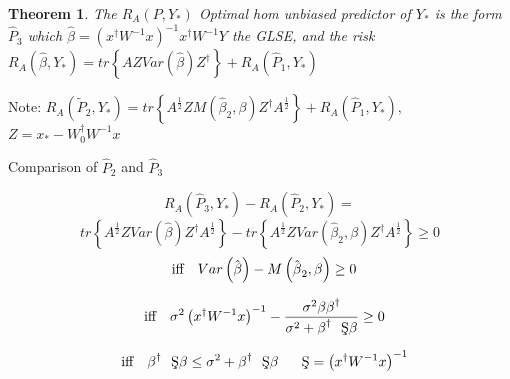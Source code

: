 \documentclass{article}
\newtheorem{theorem}{Theorem}
\begin{document}
\bigskip

\begin{theorem}
The $R_{A}\left( P,Y_{\ast }\right) $ Optimal hom unbiased predictor of $%
Y_{\ast }$ is the form $\hat{P}_{3}$ which $\hat{\beta}=\left( x^{\dagger
}W^{-1}x\right) ^{-1}x^{\dagger }W^{-1}Y$ the GLSE, and the risk $%
R_{A}\left( \hat{\beta},Y_{\ast }\right) =tr\left\{ AZVar\left( \hat{\beta}%
\right) Z^{\dagger }\right\} +R_{A}\left( \hat{P}_{1},Y_{\ast }\right) $
\end{theorem}

Note: $R_{A}\left( \tilde{P}_{2},Y_{\ast }\right) =tr\left\{ A^{\frac{1}{2}%
}ZM\left( \hat{\beta}_{2},\beta \right) Z^{\dagger }A^{\frac{1}{2}}\right\}
+R_{A}\left( \hat{P}_{1},Y_{\ast }\right) ,$ $Z=x_{\ast }-W_{0}^{\dagger
}W^{-1}x$

\bigskip 

Comparison of $\hat{P}_{2}$ and $\hat{P}_{3}$

\begin{equation*}
R_{A}\left( \hat{P}_{3},Y_{\ast }\right) -R_{A}\left( \hat{P}_{2},Y_{\ast
}\right) =
\end{equation*}%
\begin{equation*}
tr\left\{ A^{\frac{1}{2}}ZVar\left( \hat{\beta}\right) Z^{\dagger }A^{\frac{1%
}{2}}\right\} -tr\left\{ A^{\frac{1}{2}}ZVar\left( \hat{\beta}_{2},\beta
\right) Z^{\dagger }A^{\frac{1}{2}}\right\} \geq 0
\end{equation*}%
\begin{equation*}
\text{iff\quad }Var\left( \hat{\beta}\right) -M\left( \hat{\beta}_{2},\beta
\right) \geq 0
\end{equation*}

\begin{equation*}
\text{iff\quad }\sigma ^{2}\left( x^{\dagger }W^{-1}x\right) ^{-1}-\frac{%
\sigma ^{2}\beta \beta ^{\dagger }}{\sigma ^{2}+\beta ^{\dagger }\text{\c{S}}%
\beta }\geq 0
\end{equation*}

\begin{equation*}
\text{iff\quad }\beta ^{\dagger }\text{\c{S}}\beta \leq \sigma ^{2}+\beta
^{\dagger }\text{\c{S}}\beta \quad \text{\c{S}}=\left( x^{\dagger
}W^{-1}x\right) ^{-1}
\end{equation*}

\bigskip 
\end{document}

